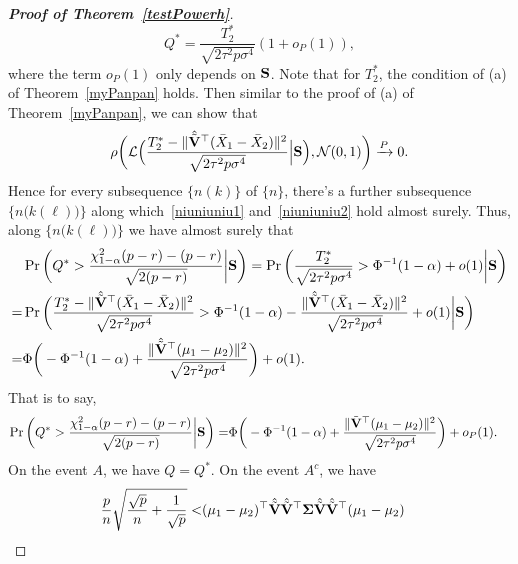 \documentclass[times,sort&compress,3p]{elsarticle}
\theoremstyle{plain}
\theoremstyle{definition}
\theoremstyle{remark}
\begin{document}
\begin{appendices}
\begin{proof}[\textbf{Proof of Theorem~\ref{testPowerh}}]
    \begin{equation}\label{niuniuniu1}
    Q^*=\frac{T_2^*}{\sqrt{2\tau^2 p\sigma^4}}(1+o_P(1)),
    \end{equation}
    where the term $o_P(1)$ only depends on $\BS$.
    Note that for $T^*_2$, the condition of (a) of Theorem~\ref{myPanpan} holds. Then similar to the proof of (a) of Theorem~\ref{myPanpan}, we can show that
    \begin{equation}\label{niuniuniu2}
    \rho\bigg(\mathcal{L}\Big(
    \frac{T_2^*-\|\hat{\tilde{\mathbf{V}}}^\top  (\bar{X}_1-\bar{X}_2)\|^2}{\sqrt{2\tau^2 p\sigma^4}}
    \Big|\mathbf{S}\Big)
        ,\mathcal{N}(0,1)\bigg)\xrightarrow{P}0.
    \end{equation}
    Hence for every subsequence $\{n(k)\}$ of $\{n\}$, there's a further subsequence $\big\{n\big(k(\ell)\big)\big\}$ along which~\eqref{niuniuniu1} and~\eqref{niuniuniu2} hold almost surely.
    Thus, along $\big\{n\big(k(\ell)\big)\big\}$ we have almost surely that
$$
    \begin{aligned}
        &\Pr\bigg(Q^*>\frac{\chi^2_{1-\alpha}(p-r)-(p-r)}{\sqrt{2(p-r)}}\bigg|\BS\bigg)
        =
        \Pr\bigg(\frac{T_2^*}{\sqrt{2\tau^2 p\sigma^4}}>\Phi^{-1}(1-\alpha)+o(1)\bigg|\BS\bigg)\\
        =&
        \Pr\bigg(\frac{T_2^*-\|\hat{\tilde{\BV}}^\top  (\bar{X}_1-\bar{X}_2)\|^2}{\sqrt{2\tau^2 p\sigma^4}}>\Phi^{-1}(1-\alpha)-\frac{\|\hat{\tilde{\BV}}^\top  (\bar{X}_1-\bar{X}_2)\|^2}{\sqrt{2\tau^2 p\sigma^4}}+o(1)\bigg|\BS\bigg)\\
        =&\Phi\bigg(-\Phi^{-1}(1-\alpha)+\frac{\|\hat{\tilde{\BV}}^\top (\mu_1-\mu_2)\|^2}{\sqrt{2\tau^2 p\sigma^4}}\bigg)+o(1).
    \end{aligned}
$$
That is to say,
    \begin{equation}\label{niuniuniu3}
    \begin{aligned}
        \Pr\bigg(Q^*>\frac{\chi^2_{1-\alpha}(p-r)-(p-r)}{\sqrt{2(p-r)}}\bigg|\mathbf{S}\bigg)
        =&\Phi\bigg(-\Phi^{-1}(1-\alpha)+\frac{\|\tilde{\mathbf{V}}^\top (\mu_1-\mu_2)\|^2}{\sqrt{2\tau^2 p\sigma^4}}\bigg)+o_P(1).
    \end{aligned}
    \end{equation}
On the event $A$, we have $Q=Q^*$.
On the event $A^c$,
we have
$$
    \begin{aligned}
            \frac{p}{n}\sqrt{\frac{\sqrt{p}}{n}+\frac{1}{\sqrt{p}}}
            <&
            (\mu_1-\mu_2)^\top  \hat{\tilde{\BV}}\hat{\tilde{\BV}}^\top  \bSigma \hat{\tilde{\BV}}\hat{\tilde{\BV}}^\top (\mu_1-\mu_2)

\end{aligned}$$
\end{proof}
\end{appendices}
\end{document}
